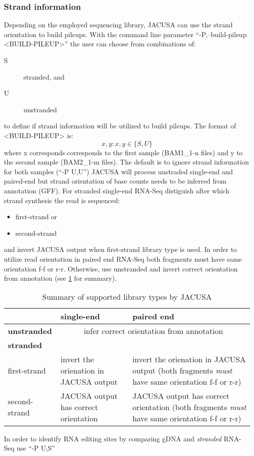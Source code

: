 \documentclass[10pt, a4paper]{article}
\begin{document}
\subsubsection{Strand information}
Depending on the employed sequencing library, JACUSA can use the strand orientation to build pileups.
With the command line parameter ``-P,--build-pileup <BUILD-PILEUP>'' the user can choose from combinations of:
\begin{description} 
\item[S] stranded, and
\item[U] unstranded
\end{description}
to define if strand information will be utilized to build pileups.
The format of <BUILD-PILEUP> is: 
$$x,y : x,y \in \{S,U\}$$ 
where x corresponds corresponds to the first sample (BAM1\_1-n files) and y to the second sample (BAM2\_1-m files).
The default is to ignore strand information for both samples (``-P U,U'')
JACUSA will process unstraded single-end and paired-end but strand orientation of base counts needs to be inferred from annotation (GFF). 
For stranded single-end RNA-Seq distiguish after which strand synthesis the read is sequenced:
\begin{itemize}
  \item first-strand or
  \item second-strand
\end{itemize}
and invert JACUSA output when first-strand library type is used.
In order to utilize read orientation in paired end RNA-Seq both fragments must have same orientation f-f or r-r.
Otherwise, use unstranded and invert correct orientation from annotation (see \ref{tbl:strandness} for summary).
\begin{table}[ht]
\caption{Summary of supported library types by JACUSA}
\label{tbl:strandness}
\begin{tabular}{lp{4cm}p{4cm}}
                    & \textbf{single-end}                    & \textbf{paired end} \\
\hline
\textbf{unstranded} & \multicolumn{2}{c}{infer correct orientation from annotation} \\
\textbf{stranded}   & \multicolumn{2}{c}{} \\
\quad first-strand  & invert the orienation in JACUSA output & invert the orienation in JACUSA output (both fragments \emph{must} have same orientation f-f or r-r) \\
\quad second-strand & JACUSA output has correct orientation  & JACUSA output has correct orientation (both fragments \emph{must} have same orientation f-f or r-r)
\end{tabular}
\end{table}
In order to identify RNA editing sites by comparing gDNA and \emph{stranded} RNA-Seq use ``-P U,S''
\end{document}
